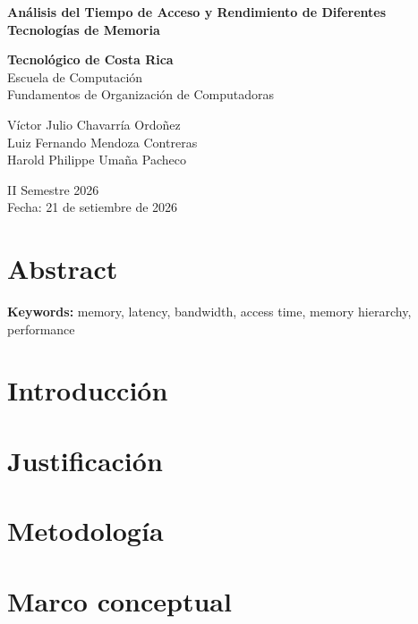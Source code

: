 \documentclass[12pt]{article}
\begin{document}
\begin{center}

{\fontsize{16}{18}\selectfont
\textbf{Análisis del Tiempo de Acceso y Rendimiento de Diferentes Tecnologías de Memoria}
}

\vspace{1cm}

\textbf{Tecnológico de Costa Rica} \\
Escuela de Computación \\
Fundamentos de Organización de Computadoras \\

\vspace{0.5cm}

Víctor Julio Chavarría Ordoñez \\
Luiz Fernando Mendoza Contreras \\
Harold Philippe Umaña Pacheco \\

\vspace{0.5cm}

II Semestre 2026 \\
Fecha: 21 de setiembre de 2026

\end{center}

\vspace{1cm}

\section*{Abstract}


\textbf{Keywords:}
memory, latency, bandwidth, access time, memory hierarchy, performance

\section{Introducción}


\section{Justificación}


\section{Metodología}


\section{Marco conceptual}
\end{document}
